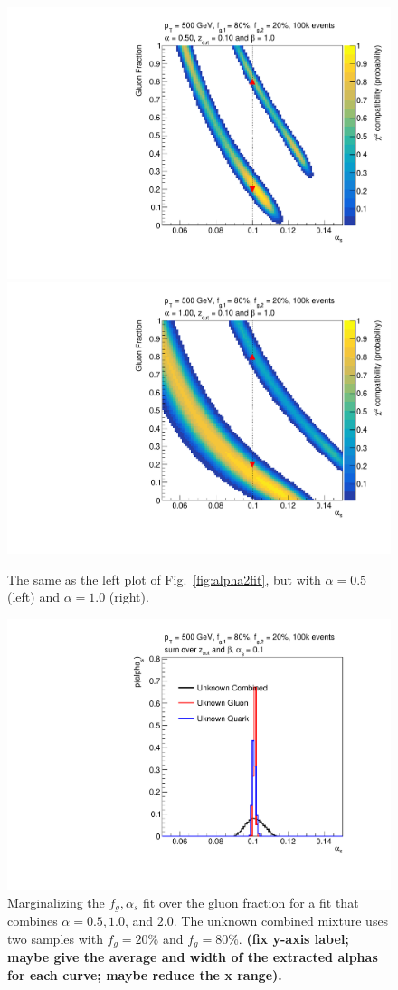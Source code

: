 
\begin{figure}[h!]
\begin{center}
\includegraphics[width = 0.45\columnwidth]{figures/banana_alpha_0_50beta_1_00_zcut_0_100.pdf}\includegraphics[width = 0.45\columnwidth]{figures/banana_alpha_1_00beta_1_00_zcut_0_100.pdf}
\end{center}
\caption{The same as the left plot of Fig.~\ref{fig:alpha2fit}, but with $\alpha=0.5$ (left) and $\alpha=1.0$ (right).}
\label{fig:morebananas}
\end{figure}

\begin{figure}[h!]
\begin{center}
\includegraphics[width = 0.49\columnwidth]{figures/combination0.pdf}
\end{center}
\caption{Marginalizing the $f_g,\alpha_s$ fit over the gluon fraction for a fit that combines $\alpha=0.5, 1.0$, and $2.0$.  The unknown combined mixture uses two samples with $f_g=20\%$ and $f_g=80\%$. \textbf{(fix y-axis label; maybe give the average and width of the extracted alphas for each curve; maybe reduce the x range).}}
\label{fig:combo}
\end{figure}

